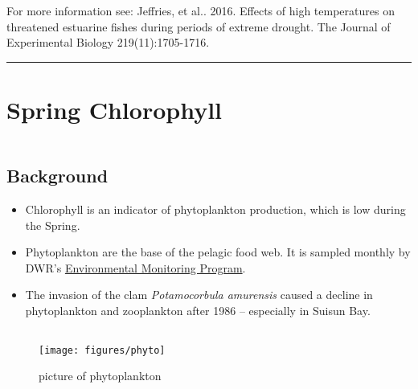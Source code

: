 \documentclass[
]{book}
\providecommand{\tightlist}{%
  \setlength{\itemsep}{0pt}\setlength{\parskip}{0pt}}
\begin{document}
\begin{disclaimer}
For more information see: Jeffries, et al.. 2016. Effects of high
temperatures on threatened estuarine fishes during periods of extreme
drought. The Journal of Experimental Biology 219(11):1705-1716.
\end{disclaimer}

\begin{center}\rule{0.5\linewidth}{0.5pt}\end{center}

\hypertarget{spring-chlorophyll}{%
\section{Spring Chlorophyll}\label{spring-chlorophyll}}

\begin{columns-nocenter}

\begin{column}

\hypertarget{background-2}{%
\subsection{Background}\label{background-2}}

\begin{itemize}
\tightlist
\item
  Chlorophyll is an indicator of phytoplankton production, which is low during the Spring.
\item
  Phytoplankton are the base of the pelagic food web. It is sampled monthly by DWR's \href{https://emp.baydeltalive.com/wiki/12297}{Environmental Monitoring Program}.
\item
  The invasion of the clam \emph{Potamocorbula amurensis} caused a decline in phytoplankton and zooplankton after 1986 -- especially in Suisun Bay.
\end{itemize}

\end{column}

\begin{column}

\begin{figure}

{\centering \texttt{[image: figures/phyto]} 

}

\caption{picture of phytoplankton}\label{fig:unnamed-chunk-18}
\end{figure}

\end{column}

\end{columns-nocenter}
\end{document}
